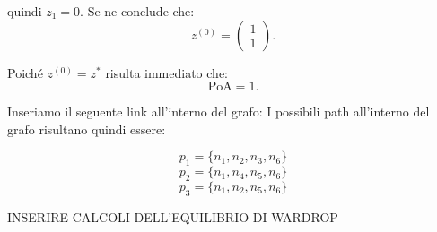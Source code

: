 \begin{alphaparts}
    quindi \(z_1 = 0.\) Se ne conclude che:
    \[ z^{(0)} = \begin{pmatrix}
        1 \\ 1
    \end{pmatrix}.\]

    Poiché \(z^{(0)} = z^*\) risulta immediato che:
    \[\text{PoA} = 1.\]

    \questionpart
   Inseriamo il seguente link all'interno del grafo:
    I possibili path all'interno del grafo risultano quindi essere:

    \[p_1 = \{n_1, n_2, n_3, n_6\}\]
    \[p_2 = \{n_1, n_4, n_5, n_6\}\]
    \[p_3 = \{n_1, n_2, n_5, n_6\}\]

    INSERIRE CALCOLI DELL'EQUILIBRIO DI WARDROP

\end{alphaparts}
